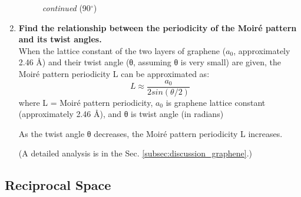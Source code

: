 \documentclass[12pt,a4paper]{article}
\begin{document}
\begin{CJK}{UTF8}{bkai}
\begin{enumerate}
\begin{figure}[h]
        \caption{\textit{continued} (90$^\circ$)}
        \label{fig:moire_90}
    \end{figure}
    \clearpage
    \item \textbf{Find the relationship between the periodicity of the Moiré pattern and its twist angles.}\\
    When the lattice constant of the two layers of graphene ($a_0$, approximately 2.46 \AA) and their twist angle (θ, assuming θ is very small) are given, the Moiré pattern periodicity L can be approximated as:
    \begin{equation}
    \label{eq:moire}
        L\approx \frac{a_0}{2sin(\theta/2)}
    \end{equation}
    where L = Moiré pattern periodicity,  $a_0$ is graphene lattice constant (approximately 2.46 Å), and θ is twist angle (in radians)
    
As the twist angle θ decreases, the Moiré pattern periodicity L increases.

(A detailed analysis is in the Sec. \ref{subsec:discussion_graphene}.)
\end{enumerate}

\subsection{Reciprocal Space}


\end{CJK}
\end{document}
